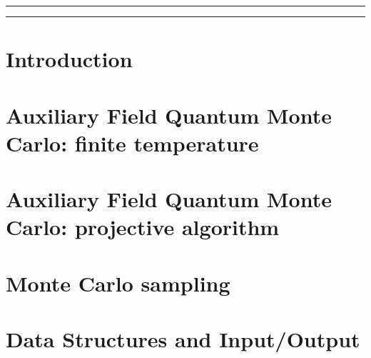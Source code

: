 \documentclass[submission, PhysCodeb]{SciPost}
\begin{document}


\vspace{10pt}
\noindent\rule{\textwidth}{1pt}
\tableofcontents\thispagestyle{fancy}
\noindent\rule{\textwidth}{1pt}
\vspace{10pt}

\section{Introduction}\label{sec:intro}

\section{Auxiliary Field Quantum Monte Carlo: finite temperature}\label{sec:def}






\section{Auxiliary Field Quantum Monte Carlo: projective algorithm}\label{sec:defT0}

\section{Monte Carlo sampling}\label{sec:sampling}

\section{Data Structures and Input/Output}\label{sec:imp}


\end{document}

